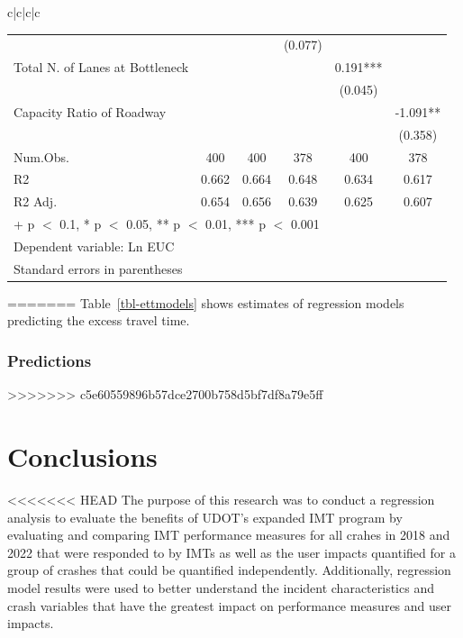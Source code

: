 \documentclass[
  letterpaper,
  authoryear]{elsarticle}
\begin{document}
\begin{table}
{\begin{tabular}[t]{c|c|c|c}
\begin{table}
\begin{table}
{\begin{tabular}[t]{lccccc}
 &  &  & (0.077) &  & \\
Total N. of Lanes at Bottleneck &  &  &  & 0.191*** & \\
 &  &  &  & (0.045) & \\
Capacity Ratio of Roadway &  &  &  &  & -1.091**\\
 &  &  &  &  & (0.358)\\
\midrule
Num.Obs. & 400 & 400 & 378 & 400 & 378\\
R2 & 0.662 & 0.664 & 0.648 & 0.634 & 0.617\\
R2 Adj. & 0.654 & 0.656 & 0.639 & 0.625 & 0.607\\
\bottomrule
\multicolumn{6}{l}{\rule{0pt}{1em}+ p $<$ 0.1, * p $<$ 0.05, ** p $<$ 0.01, *** p $<$ 0.001}\\
\multicolumn{6}{l}{\rule{0pt}{1em}Dependent variable: Ln EUC}\\
\multicolumn{6}{l}{\rule{0pt}{1em}Standard errors in parentheses}\\
\end{tabular}

}

\end{table}%
=======
Table~\ref{tbl-ettmodels} shows estimates of regression models
predicting the excess travel time.

\subsubsection{Predictions}\label{predictions}
>>>>>>> c5e60559896b57dce2700b758d5bf7df8a79e5ff


\section{Conclusions}\label{conclusions}

<<<<<<< HEAD
The purpose of this research was to conduct a regression analysis to
evaluate the benefits of UDOT's expanded IMT program by evaluating and
comparing IMT performance measures for all crahes in 2018 and 2022 that
were responded to by IMTs as well as the user impacts quantified for a
group of crashes that could be quantified independently. Additionally,
regression model results were used to better understand the incident
characteristics and crash variables that have the greatest impact on
performance measures and user impacts.


\end{table}
\end{tabular}}
\end{table}
\end{document}
